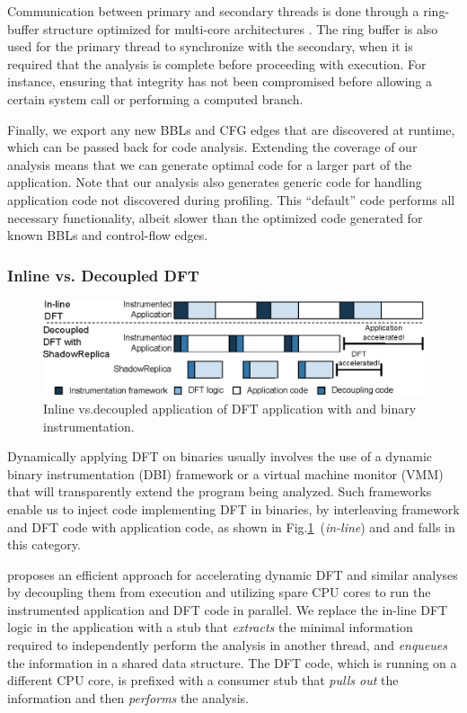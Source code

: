 Communication between primary and secondary threads is done through a
ring-buffer structure optimized for multi-core architectures . The ring buffer
is also used for the primary thread to synchronize with the secondary, when it
is required that the analysis is complete before proceeding with execution. For
instance, ensuring that integrity has not been compromised before allowing a
certain system call or performing a computed branch.

Finally, we export any new BBLs and CFG edges that are discovered at runtime,
which can be passed back for code analysis. Extending the coverage of our
analysis means that we can generate optimal code for a larger part of the
application. Note that our analysis also generates generic code for handling
application code not discovered during profiling. This “default” code performs
all necessary functionality, albeit slower than the optimized code generated
for known BBLs and control-flow edges.

\subsubsection{Inline vs. Decoupled DFT}
\label{sec:inlinevsdecoupled}

\begin{figure}[tb]
    \centering
    \includegraphics[width=0.65\linewidth]{figs/decoupling.eps}
    \caption{Inline vs.decoupled application of DFT application with \sreplica
    and binary instrumentation.\label{fig:decoupling}}
\end{figure}

Dynamically applying DFT on binaries usually involves the use of a dynamic
binary instrumentation (DBI) framework or a virtual machine monitor (VMM) that
will transparently extend the program being analyzed. Such frameworks enable us
to inject code implementing DFT in binaries, by interleaving framework and DFT
code with application code, as shown in
Fig.\ref{fig:decoupling}~(\textit{in-line}) and \libdft and \tfa falls in this
category.

\sreplica proposes an efficient approach for accelerating dynamic DFT and similar
analyses by decoupling them from execution and utilizing spare CPU cores to run
the instrumented application and DFT code in parallel. We replace the in-line
DFT logic in the application with a stub that \emph{extracts} the minimal
information required to independently perform the analysis in another thread,
and \emph{enqueues} the information in a shared data structure. The DFT code,
which is running on a different CPU core, is prefixed with a consumer stub that
\emph{pulls out} the information and then \emph{performs} the analysis.

